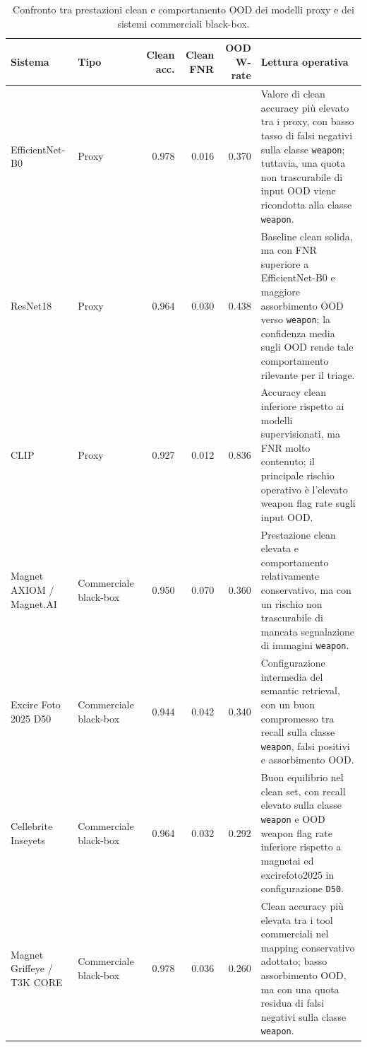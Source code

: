 \begin{table}[H]
\centering
\caption{Confronto tra prestazioni clean e comportamento OOD dei modelli proxy e dei sistemi commerciali black-box.}
\label{tab:results-comparative-clean-ood}
\small
\renewcommand{\arraystretch}{1.18}
\setlength{\tabcolsep}{3pt}
\begin{tabularx}{\textwidth}{@{}p{2.65cm} p{1.75cm} r r r X@{}}
\toprule
\textbf{Sistema} &
\textbf{Tipo} &
\textbf{Clean acc.} &
\textbf{Clean FNR} &
\textbf{OOD W-rate} &
\textbf{Lettura operativa} \\
\midrule

EfficientNet-B0 &
Proxy &
0.978 &
0.016 &
0.370 &
Valore di clean accuracy più elevato tra i proxy, con basso tasso di falsi negativi sulla
classe \texttt{weapon}; tuttavia, una quota non trascurabile di input OOD viene
ricondotta alla classe \texttt{weapon}. \\

ResNet18 &
Proxy &
0.964 &
0.030 &
0.438 &
Baseline clean solida, ma con FNR superiore a EfficientNet-B0 e maggiore
assorbimento OOD verso \texttt{weapon}; la confidenza media sugli OOD rende tale
comportamento rilevante per il triage. \\

CLIP &
Proxy &
0.927 &
0.012 &
0.836 &
Accuracy clean inferiore rispetto ai modelli supervisionati, ma FNR molto
contenuto; il principale rischio operativo è l'elevato weapon flag rate sugli
input OOD. \\

Magnet AXIOM / Magnet.AI &
Commerciale black-box &
0.950 &
0.070 &
0.360 &
Prestazione clean elevata e comportamento relativamente conservativo, ma con un
rischio non trascurabile di mancata segnalazione di immagini \texttt{weapon}. \\

Excire Foto 2025 D50 &
Commerciale black-box &
0.944 &
0.042 &
0.340 &
Configurazione intermedia del semantic retrieval, con un buon compromesso tra
recall sulla classe \texttt{weapon}, falsi positivi e assorbimento OOD. \\

Cellebrite Inseyets &
Commerciale black-box &
0.964 &
0.032 &
0.292 &
Buon equilibrio nel clean set, con recall elevato sulla classe
\texttt{weapon} e OOD weapon flag rate inferiore rispetto a
\gls{magnetai} ed \gls{excirefoto2025} in configurazione \texttt{D50}. \\

Magnet Griffeye / T3K CORE &
Commerciale black-box &
0.978 &
0.036 &
0.260 &
Clean accuracy più elevata tra i tool commerciali nel mapping conservativo adottato; basso
assorbimento OOD, ma con una quota residua di falsi negativi sulla classe
\texttt{weapon}. \\

\bottomrule
\end{tabularx}
\end{table}

